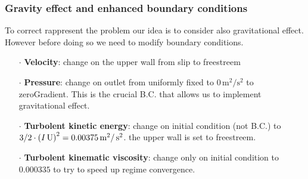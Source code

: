 \documentclass[aspectratio=169]{beamer}
\newcommand{\foam}[1]{{\ttfamily #1}}
\begin{document}
\begin{frame}
\frametitle{Gravity effect and enhanced boundary conditions}

To correct rappresent the problem our idea is to consider also gravitational effect. 
However before doing so we need to modify boundary conditions.

\begin{itemize}
\item[$\cdot$] \textbf{Velocity}: change on the upper wall from \foam{slip} to \foam{freestreem}

\item[$\cdot$] \textbf{Pressure}: change on outlet from uniformly fixed to $0 \,\text{m}^2/\text{s}^2$ to \foam{zeroGradient}. 
This is the crucial B.C. that allows us to implement gravitational effect.

\item[$\cdot$] \textbf{Turbolent kinetic energy}: change on initial condition (not B.C.) to  $ 3/2 \cdot \left(I\, \text{U} \right) ^2 = 0.00375 \,\text{m}^2 / \,\text{s}^2$.
the upper wall is set to \foam{freestreem}.

\item[$\cdot$] \textbf{Turbolent kinematic viscosity}: change only on initial condition to $0.000335$ to try to speed up regime convergence.
\end{itemize}

\end{frame}
\end{document}
